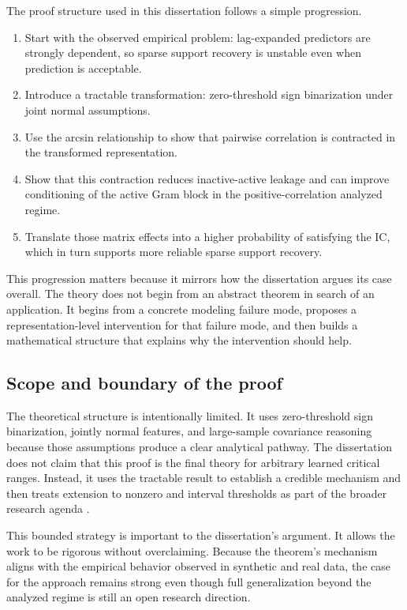 The proof structure used in this dissertation follows a simple progression.
\begin{enumerate}
    \item Start with the observed empirical problem: lag-expanded predictors are strongly dependent, so sparse support recovery is unstable even when prediction is acceptable.
    \item Introduce a tractable transformation: zero-threshold sign binarization under joint normal assumptions.
    \item Use the arcsin relationship to show that pairwise correlation is contracted in the transformed representation.
    \item Show that this contraction reduces inactive-active leakage and can improve conditioning of the active Gram block in the positive-correlation analyzed regime.
    \item Translate those matrix effects into a higher probability of satisfying the IC, which in turn supports more reliable sparse support recovery.
\end{enumerate}

This progression matters because it mirrors how the dissertation argues its case overall. The theory does not begin from an abstract theorem in search of an application. It begins from a concrete modeling failure mode, proposes a representation-level intervention for that failure mode, and then builds a mathematical structure that explains why the intervention should help.

\subsection{Scope and boundary of the proof}

The theoretical structure is intentionally limited. It uses zero-threshold sign binarization, jointly normal features, and large-sample covariance reasoning because those assumptions produce a clear analytical pathway. The dissertation does not claim that this proof is the final theory for arbitrary learned critical ranges. Instead, it uses the tractable result to establish a credible mechanism and then treats extension to nonzero and interval thresholds as part of the broader research agenda \autocite{JOrender2025Efficient}.

This bounded strategy is important to the dissertation's argument. It allows the work to be rigorous without overclaiming. Because the theorem's mechanism aligns with the empirical behavior observed in synthetic and real data, the case for the approach remains strong even though full generalization beyond the analyzed regime is still an open research direction.

